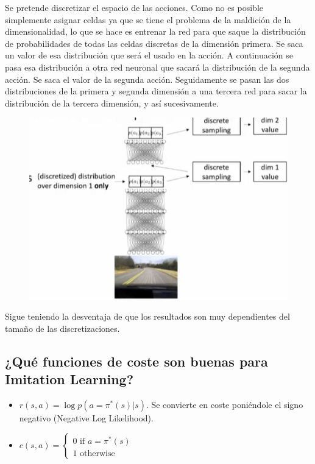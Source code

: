 Se pretende discretizar el espacio de las acciones. Como no es posible simplemente asignar
celdas ya que se tiene el problema de la maldición de la dimensionalidad, lo que se hace es
entrenar la red para que saque la distribución de probabilidades de todas las celdas discretas
de la dimensión primera. Se saca un valor de esa distribución que será el usado en la acción.
A continuación se pasa esa distribución a otra red neuronal que sacará la distribución de la
segunda acción. Se saca el valor de la segunda acción. Seguidamente se pasan las dos
distribuciones de la primera y segunda dimensión a una tercera red para sacar la
distribución de la tercera dimensión, y así sucesivamente.

\begin{figure}[htpb]
	\centering
	\includegraphics[width=0.8\linewidth]{figures/2020-06-11-141237_517x364_scrot.png}
\end{figure}

Sigue teniendo la desventaja de que los resultados son muy dependientes del tamaño de las
discretizaciones.

\subsection{¿Qué funciones de coste son buenas para Imitation Learning?}%
\label{ssub:_qué_funciones_de_coste_son_buenas_para_imitation_learning_}

\begin{itemize}
    \item $r(s,a) = \log p(a=\pi^*(s) | s)$. Se convierte en coste poniéndole el signo
        negativo (Negative Log Likelihood).
    \item $c(s, a) = \begin{cases}
            0 \textrm{ if } a = \pi^*(s)\\
            1 \textrm{ otherwise }
    \end{cases}$
\end{itemize}

